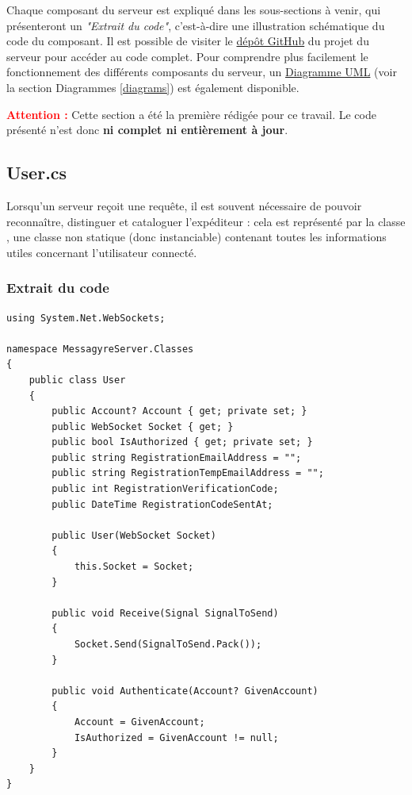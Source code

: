 \documentclass[12pt]{report}
\begin{document}
	Chaque composant du serveur est expliqué dans les sous-sections à venir, qui présenteront un \textit{"Extrait du code"}, c’est-à-dire une illustration schématique du code du composant. Il est possible de visiter le \href{https://github.com/Gravi32/MessagyreServer.git}{dépôt GitHub} du projet du serveur pour accéder au code complet.
	Pour comprendre plus facilement le fonctionnement des différents composants du serveur, un \href{https://lucid.app/lucidchart/b8dadd52-61fd-468b-8bd6-a81aa133eb02/edit?viewport_loc=-3637\%2C-1769\%2C9681\%2C4831\%2C0_0&invitationId=inv_fa22bca5-082d-4666-b827-15f4adaa3a38}{Diagramme UML} (voir la section Diagrammes \ref{diagrams}) est également disponible.
	
	\begin{center}
		\textbf{\textcolor{red}{Attention :}} Cette section a été la première rédigée pour ce travail. Le code présenté n’est donc \textbf{ni complet ni entièrement à jour}.
	\end{center}
	
	\subsection{User.cs}
	
	Lorsqu’un serveur reçoit une requête, il est souvent nécessaire de pouvoir reconnaître, distinguer et cataloguer l’expéditeur : cela est représenté par la classe , une classe non statique (donc instanciable) contenant toutes les informations utiles concernant l’utilisateur connecté.
	
	\subsubsection{Extrait du code}
	\begin{verbatim}
using System.Net.WebSockets;

namespace MessagyreServer.Classes
{
	public class User
	{
		public Account? Account { get; private set; }
		public WebSocket Socket { get; }
		public bool IsAuthorized { get; private set; }
		public string RegistrationEmailAddress = "";
		public string RegistrationTempEmailAddress = "";
		public int RegistrationVerificationCode;
		public DateTime RegistrationCodeSentAt;
		
		public User(WebSocket Socket)
		{
			this.Socket = Socket;
		}
		
		public void Receive(Signal SignalToSend)
		{
			Socket.Send(SignalToSend.Pack());
		}
		
		public void Authenticate(Account? GivenAccount)
		{
			Account = GivenAccount;
			IsAuthorized = GivenAccount != null;
		}
	}
}
	\end{verbatim}
	
\end{document}
